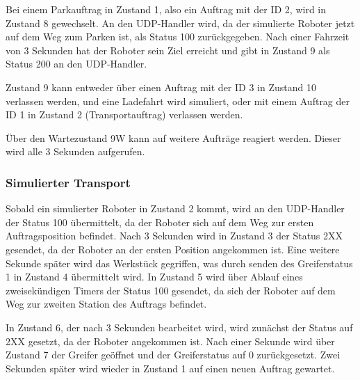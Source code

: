 Bei einem Parkauftrag in Zustand 1, also ein Auftrag mit der ID 2, wird in Zustand 8 gewechselt. An den UDP-Handler wird, da der simulierte Roboter jetzt auf dem Weg zum Parken ist, als Status 100 zurückgegeben. Nach einer Fahrzeit von 3 Sekunden hat der Roboter sein Ziel erreicht und gibt in Zustand 9 als Status 200 an den UDP-Handler. 

Zustand 9 kann entweder über einen Auftrag mit der ID 3 in Zustand 10 verlassen werden, und eine Ladefahrt wird simuliert, oder mit einem Auftrag der ID 1 in Zustand 2 (Transportauftrag) verlassen werden. 

Über den Wartezustand 9W kann auf weitere Aufträge reagiert werden. Dieser wird alle 3 Sekunden aufgerufen. 

\subsubsection{Simulierter Transport}

Sobald ein simulierter Roboter in Zustand 2 kommt, wird an den UDP-Handler der Status 100 übermittelt, da der Roboter sich auf dem Weg zur ersten Auftragsposition befindet. Nach 3 Sekunden wird in Zustand 3 der Status 2XX gesendet, da der Roboter an der ersten Position angekommen ist. Eine weitere Sekunde später wird das Werkstück gegriffen, was durch senden des Greiferstatus 1 in Zustand 4 übermittelt wird. In Zustand 5 wird über Ablauf eines zweisekündigen Timers der Status 100 gesendet, da sich der Roboter auf dem Weg zur zweiten Station des Auftrags befindet. 

In Zustand 6, der nach 3 Sekunden bearbeitet wird, wird zunächst der Status auf 2XX gesetzt, da der Roboter angekommen ist. Nach einer Sekunde wird über Zustand 7 der Greifer geöffnet und der Greiferstatus auf 0 zurückgesetzt. Zwei Sekunden später wird wieder in Zustand 1 auf einen neuen Auftrag gewartet. 
